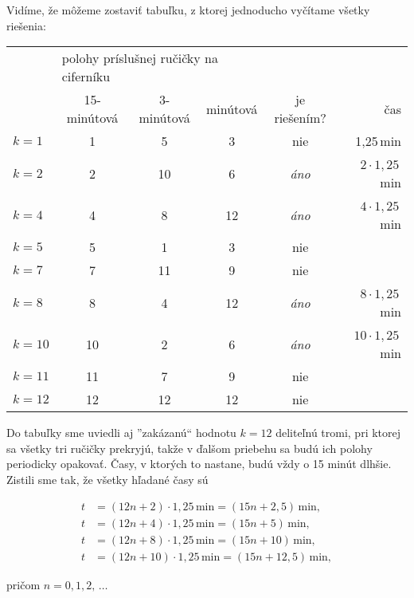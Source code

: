 {Vidíme, že môžeme zostaviť tabuľku, z ktorej jednoducho vyčítame všetky riešenia:
\begin{center}
\begin{tabular}{l c c c c r}
\hline
 & \multicolumn{3}{l}{polohy príslušnej ručičky na ciferníku} &  & \\
 & 15-minútová & 3-minútová & minútová & je riešením? & čas \\
 \hline
 $k=1$ & 1 & 5 & 3 & nie & 1,25\,min \\
 $k=2$ & 2 & 10 & 6 & \textit{áno} & $2\cdot1,25$\,min \\
 $k=4$ & 4 & 8 & 12 & \textit{áno} & $4\cdot1,25$\,min \\
 $k=5$ & 5 & 1 & 3 & nie &  \\
 $k=7$ & 7 & 11 & 9 & nie &  \\
 $k=8$ & 8 & 4 & 12 & \textit{áno} & $8\cdot 1,25$\,min \\
 $k=10$ & 10 & 2 & 6 & \textit{áno} & $10\cdot1,25$\,min \\
 $k=11$ & 11 & 7 & 9 & nie & \\
 $k=12$ & 12 & 12 & 12 & nie & \\
 \hline
\end{tabular}
\end{center}

Do tabuľky sme uviedli aj ”zakázanú“ hodnotu $k = 12$ deliteľnú tromi, pri ktorej sa všetky tri ručičky prekryjú, takže v ďalšom priebehu sa budú ich polohy periodicky opakovať. Časy, v ktorých to nastane, budú vždy o 15 minút dlhšie. Zistili sme tak, že
všetky hľadané časy sú
\begin{center}
\begin{align*}
t &= (12n + 2) \cdot 1, 25\,\text{min} =(15n + 2, 5)\,\text{min},\\
t &= (12n + 4) \cdot 1, 25\,\text{min}= (15n + 5)\,\text{min},\\
t &= (12n + 8) \cdot 1, 25\,\text{min}  = (15n + 10)\,\text{min},\\
t &= (12n + 10) \cdot 1, 25 \,\text{min} = (15n + 12, 5)\,\text{min},
\end{align*}
\end{center}
pričom $n = 0, 1, 2,\,\ldots$
}